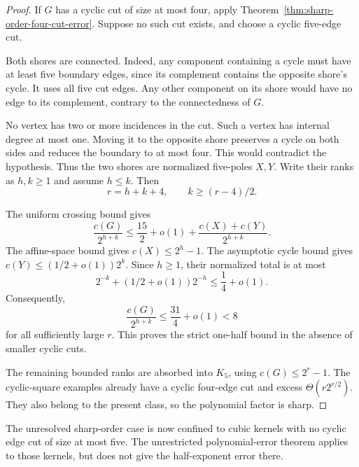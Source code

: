 \begin{proof}
If $G$ has a cyclic cut of size at most four, apply Theorem~\ref{thm:sharp-order-four-cut-error}.
Suppose no such cut exists, and choose a cyclic five-edge cut.

Both shores are connected.
Indeed, any component containing a cycle must have at least five boundary edges, since its complement contains the opposite shore's cycle.
It uses all five cut edges.
Any other component on its shore would have no edge to its complement, contrary to the connectedness of $G$.

No vertex has two or more incidences in the cut.
Such a vertex has internal degree at most one.
Moving it to the opposite shore preserves a cycle on both sides and reduces the boundary to at most four.
This would contradict the hypothesis.
Thus the two shores are normalized five-poles $X,Y$.
Write their ranks as $h,k\ge1$ and assume $h\le k$.
Then
\[
 r=h+k+4,\qquad k\ge(r-4)/2.
\]

The uniform crossing bound gives
\[
 \frac{c(G)}{2^{h+k}}
 \le\frac{15}{2}+o(1)
    +\frac{c(X)+c(Y)}{2^{h+k}}.
\]
The affine-space bound gives $c(X)\le2^h-1$.
The asymptotic cycle bound gives $c(Y)\le(1/2+o(1))2^k$.
Since $h\ge1$, their normalized total is at most
\[
 2^{-k}+(1/2+o(1))2^{-h}
 \le\frac14+o(1).
\]
Consequently,
\[
 \frac{c(G)}{2^{h+k}}\le\frac{31}{4}+o(1)<8
\]
for all sufficiently large $r$.
This proves the strict one-half bound in the absence of smaller cyclic cuts.

The remaining bounded ranks are absorbed into $K_5$, using $c(G)\le2^r-1$.
The cyclic-square examples already have a cyclic four-edge cut and excess $\Theta(r2^{r/2})$.
They also belong to the present class, so the polynomial factor is sharp.
\end{proof}

The unresolved sharp-order case is now confined to cubic kernels with no cyclic edge cut of size at most five.
The unrestricted polynomial-error theorem applies to those kernels, but does not give the half-exponent error there.
